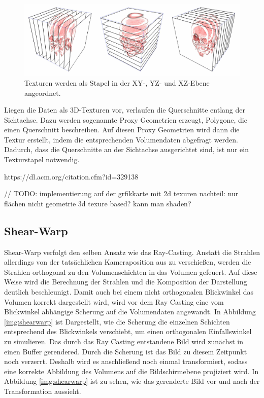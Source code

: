 \begin{figure}
	\centering
	\includegraphics[width=0.7\linewidth]{images/textureStacks.png}
	\caption{Texturen werden als Stapel in der 	XY-, YZ- und XZ-Ebene angeordnet.}
	\label{img:textureBased}
\end{figure}

Liegen die Daten als 3D-Texturen vor, verlaufen die Querschnitte entlang der Sichtachse. Dazu werden sogenannte Proxy Geometrien erzeugt, Polygone, die einen Querschnitt beschreiben. Auf diesen Proxy Geometrien wird dann die Textur erstellt, indem die entsprechenden Volumendaten abgefragt werden. Dadurch, dass die Querschnitte an der Sichtachse ausgerichtet sind, ist nur ein Texturstapel notwendig. 


https://dl.acm.org/citation.cfm?id=329138

// TODO:
implementierung auf der grfikkarte mit 2d texuren nachteil: nur flächen nicht geometrie
3d texure based? 	
kann man shaden?

\subsection{Shear-Warp}

Shear-Warp verfolgt den selben Ansatz wie das Ray-Casting. Anstatt die Strahlen allerdings von der tatsächlichen Kameraposition aus zu verschießen, werden die Strahlen orthogonal zu den Volumenschichten in das Volumen gefeuert. Auf diese Weise wird die Berechnung der Strahlen und die Komposition der Darstellung deutlich beschleunigt. 
Damit auch bei einem nicht orthogonalen Blickwinkel das Volumen korrekt dargestellt wird, wird vor dem Ray Casting eine vom Blickwinkel abhängige Scherung auf die Volumendaten angewandt. In Abbildung \ref{img:shearwarp} ist Dargestellt, wie die Scherung die einzelnen Schichten entsprechend des Blickwinkels verschiebt, um einen orthogonalen Einfallswinkel zu simulieren. 
Das durch das Ray Casting entstandene Bild wird zunächst in einen Buffer gerendered. Durch die Scherung ist das Bild zu diesem Zeitpunkt noch verzerrt. Deshalb wird es anschließend noch einmal transformiert, sodass eine korrekte Abbildung des Volumens auf die Bildschirmebene projiziert wird. In Abbildung \ref{img:shearwarp} ist zu sehen, wie das gerenderte Bild vor und nach der Transformation aussieht. 


